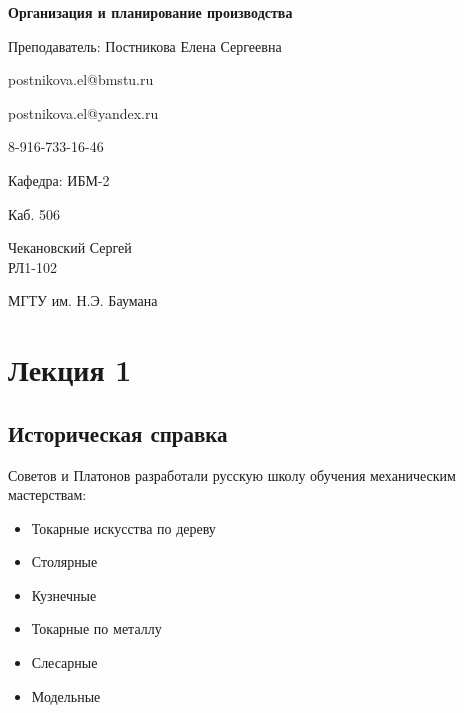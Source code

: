 \documentclass[14pt,a4paper,oneside]{extarticle}
\begin{document}
\RaggedRight


\begin{titlepage}
    \begin{center}
        \vspace*{1cm}

        \Huge
        \textbf{Организация и планирование производства}

        \vspace{0.5cm}
        \LARGE
        Преподаватель: Постникова Елена Сергеевна

        postnikova.el@bmstu.ru

        postnikova.el@yandex.ru

        8-916-733-16-46


        \vspace{1.5cm}

        Кафедра: ИБМ-2

        Каб. 506

        \vfill

        Чекановский Сергей\\
        РЛ1-102

        \vspace{0.8cm}


        \Large
        МГТУ им. Н.Э. Баумана

    \end{center}
\end{titlepage}

\tableofcontents

\clearpage

\section{Лекция 1}

\subsection{Историческая справка}

Советов и Платонов разработали русскую школу обучения механическим мастерствам:

\begin{itemize}
    \item Токарные искусства по дереву
    \item Столярные
    \item Кузнечные
    \item Токарные по металлу
    \item Слесарные
    \item Модельные
\end{itemize}
\end{document}
